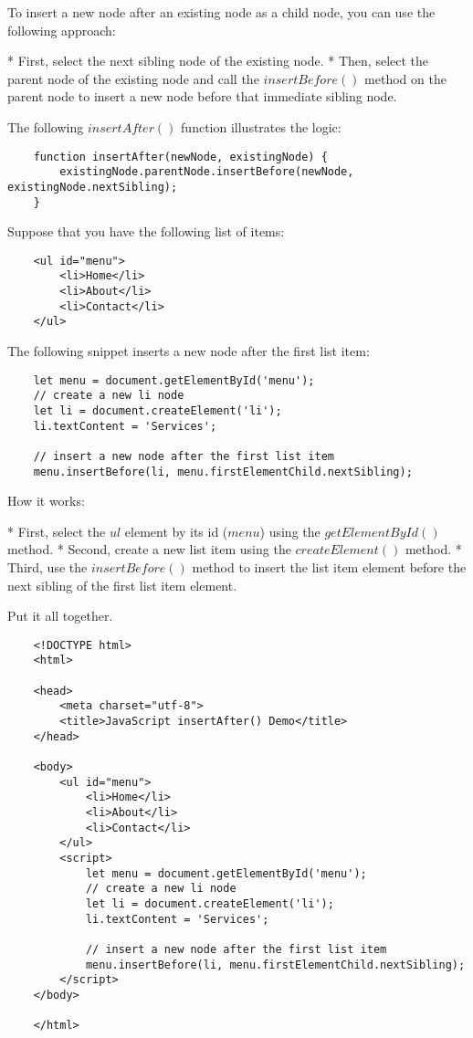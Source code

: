 \documentclass[11pt]{article}
\begin{document}
To insert a new node after an existing node as a child node,
you can use the following approach:

* First, select the next sibling node of the existing node.
* Then, select the parent node of the existing node and call
the $insertBefore()$ method on the parent node to insert a new node
before that immediate sibling node.

The following $insertAfter()$ function illustrates the logic:

\begin{lstlisting}
    function insertAfter(newNode, existingNode) {
        existingNode.parentNode.insertBefore(newNode, existingNode.nextSibling);
    }
\end{lstlisting}

Suppose that you have the following list of items:

\begin{lstlisting}
    <ul id="menu">
        <li>Home</li>   
        <li>About</li>
        <li>Contact</li>
    </ul>
\end{lstlisting}

The following snippet inserts a new node after the first list item:

\begin{lstlisting}
    let menu = document.getElementById('menu');
    // create a new li node
    let li = document.createElement('li');
    li.textContent = 'Services';

    // insert a new node after the first list item
    menu.insertBefore(li, menu.firstElementChild.nextSibling);
\end{lstlisting}

How it works:

* First, select the $ul$ element by its id ($menu$) using
the $getElementById()$ method.
* Second, create a new list item using the $createElement()$ method.
* Third, use the $insertBefore()$ method to insert the list item element
before the next sibling of the first list item element.

Put it all together.

\begin{lstlisting}
    <!DOCTYPE html>
    <html>

    <head>
        <meta charset="utf-8">
        <title>JavaScript insertAfter() Demo</title>
    </head>

    <body>
        <ul id="menu">
            <li>Home</li>
            <li>About</li>
            <li>Contact</li>
        </ul>
        <script>
            let menu = document.getElementById('menu');
            // create a new li node
            let li = document.createElement('li');
            li.textContent = 'Services';

            // insert a new node after the first list item
            menu.insertBefore(li, menu.firstElementChild.nextSibling);
        </script>
    </body>

    </html>
\end{lstlisting}
\end{document}
